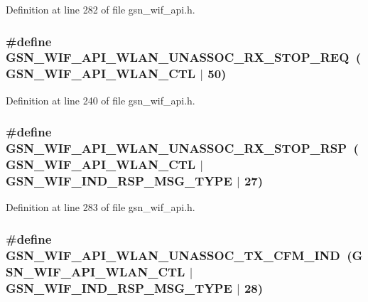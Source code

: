 Definition at line 282 of file gsn\_\-wif\_\-api.h.

\hypertarget{a00606_ae32f5c6804303b9f5281f38db9605ab0}{
\subsubsection[{GSN\_\-WIF\_\-API\_\-WLAN\_\-UNASSOC\_\-RX\_\-STOP\_\-REQ}]{\setlength{\rightskip}{0pt plus 5cm}\#define GSN\_\-WIF\_\-API\_\-WLAN\_\-UNASSOC\_\-RX\_\-STOP\_\-REQ~(GSN\_\-WIF\_\-API\_\-WLAN\_\-CTL $|$ 50)}}
\label{a00606_ae32f5c6804303b9f5281f38db9605ab0}


Definition at line 240 of file gsn\_\-wif\_\-api.h.

\hypertarget{a00606_ad2dd03a292cee38878b70dff36b5226e}{
\subsubsection[{GSN\_\-WIF\_\-API\_\-WLAN\_\-UNASSOC\_\-RX\_\-STOP\_\-RSP}]{\setlength{\rightskip}{0pt plus 5cm}\#define GSN\_\-WIF\_\-API\_\-WLAN\_\-UNASSOC\_\-RX\_\-STOP\_\-RSP~(GSN\_\-WIF\_\-API\_\-WLAN\_\-CTL $|$ GSN\_\-WIF\_\-IND\_\-RSP\_\-MSG\_\-TYPE $|$ 27)}}
\label{a00606_ad2dd03a292cee38878b70dff36b5226e}


Definition at line 283 of file gsn\_\-wif\_\-api.h.

\hypertarget{a00606_a76c950c06223a6ea6b05ae45124c7846}{
\subsubsection[{GSN\_\-WIF\_\-API\_\-WLAN\_\-UNASSOC\_\-TX\_\-CFM\_\-IND}]{\setlength{\rightskip}{0pt plus 5cm}\#define GSN\_\-WIF\_\-API\_\-WLAN\_\-UNASSOC\_\-TX\_\-CFM\_\-IND~(GSN\_\-WIF\_\-API\_\-WLAN\_\-CTL $|$ GSN\_\-WIF\_\-IND\_\-RSP\_\-MSG\_\-TYPE $|$ 28)}}
\label{a00606_a76c950c06223a6ea6b05ae45124c7846}


